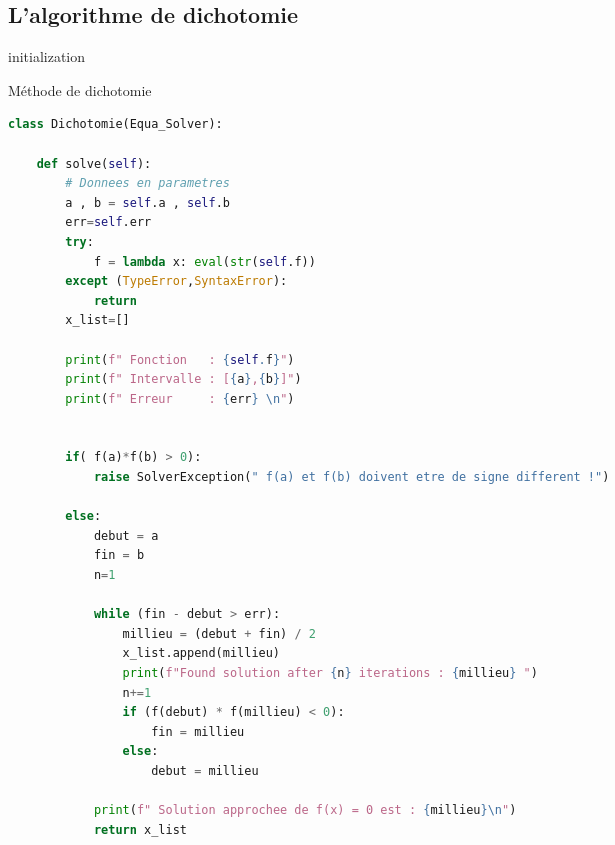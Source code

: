 \documentclass{article}
\begin{document}
\subsection{L'algorithme de dichotomie}

\begin{algorithm}[H]
\SetAlgoLined
{}
 initialization\;
 \caption{Méthode de dichotomie}
\end{algorithm}


\lstset{style=mystyle}
\newpage
\begin{lstlisting}[language=Python, caption=Méthode de dichotomie en Python]
class Dichotomie(Equa_Solver):

    def solve(self):
        # Donnees en parametres
        a , b = self.a , self.b
        err=self.err
        try:
            f = lambda x: eval(str(self.f))
        except (TypeError,SyntaxError):
            return
        x_list=[]

        print(f" Fonction   : {self.f}")
        print(f" Intervalle : [{a},{b}]")
        print(f" Erreur     : {err} \n")


        if( f(a)*f(b) > 0):
            raise SolverException(" f(a) et f(b) doivent etre de signe different !")

        else:
            debut = a
            fin = b
            n=1

            while (fin - debut > err):
                millieu = (debut + fin) / 2
                x_list.append(millieu)
                print(f"Found solution after {n} iterations : {millieu} ")
                n+=1
                if (f(debut) * f(millieu) < 0):
                    fin = millieu
                else:
                    debut = millieu

            print(f" Solution approchee de f(x) = 0 est : {millieu}\n")
            return x_list
\end{lstlisting}
\end{document}
